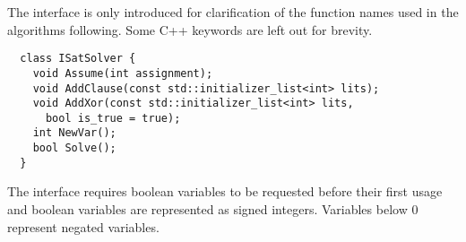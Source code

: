 The interface is only introduced for clarification of the function names used in the algorithms following. Some C++ keywords are left out for brevity.

\begin{lstlisting}
  class ISatSolver {
    void Assume(int assignment);
    void AddClause(const std::initializer_list<int> lits);
    void AddXor(const std::initializer_list<int> lits,
      bool is_true = true);
    int NewVar();
    bool Solve();
  }
\end{lstlisting}

The interface requires boolean variables to be requested before their first usage and boolean variables are represented as signed integers. Variables below 0 represent negated variables.
